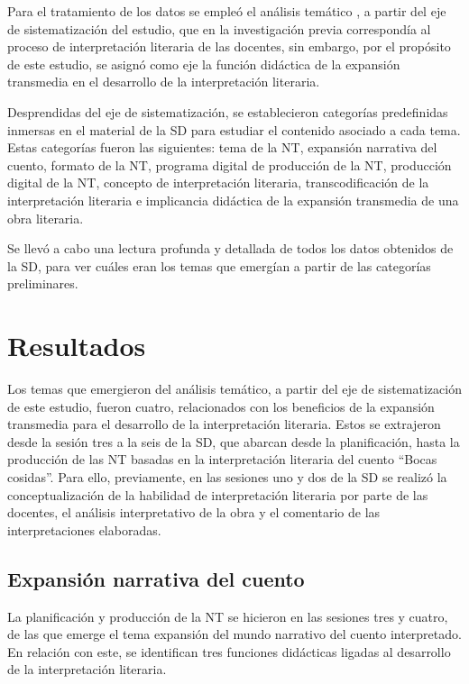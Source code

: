 \documentclass[spanish]{textolivre}
\begin{document}
Para el tratamiento de los datos se empleó el análisis temático , 
a partir del eje de sistematización del estudio, que en la investigación previa correspondía al proceso de interpretación literaria de las docentes, sin embargo, por el propósito de este estudio, se asignó como eje la función didáctica de la expansión transmedia en el desarrollo de la interpretación literaria.

Desprendidas del eje de sistematización, se establecieron categorías predefinidas inmersas en el material de la SD para estudiar el contenido asociado a cada tema. Estas categorías fueron las siguientes: tema de la NT, expansión narrativa del cuento, formato de la NT, programa digital de producción de la NT, producción digital de la NT, concepto de interpretación literaria, transcodificación de la interpretación literaria e implicancia didáctica de la expansión transmedia de una obra literaria. 

Se llevó a cabo una lectura profunda y detallada de todos los datos obtenidos de la SD, para ver cuáles eran los temas que emergían a partir de las categorías preliminares.

\section{Resultados}\label{sec-autores}
Los temas que emergieron del análisis temático, a partir del eje de sistematización de este estudio, fueron cuatro, relacionados con los beneficios de la expansión transmedia para el desarrollo de la interpretación literaria. Estos se extrajeron desde la sesión tres a la seis de la SD, que abarcan desde la planificación, hasta la producción de las NT basadas en la interpretación literaria del cuento “Bocas cosidas”. Para ello, previamente, en las sesiones uno y dos de la SD se realizó la conceptualización de la habilidad de interpretación literaria por parte de las docentes, el análisis interpretativo de la obra y el comentario de las interpretaciones elaboradas. 

\subsection{Expansión narrativa del cuento}\label{sec-idioma}
La planificación y producción de la NT se hicieron en las sesiones tres y cuatro, de las que emerge el tema expansión del mundo narrativo del cuento interpretado. En relación con este, se identifican tres funciones didácticas ligadas al desarrollo de la interpretación literaria. 
\end{document}
